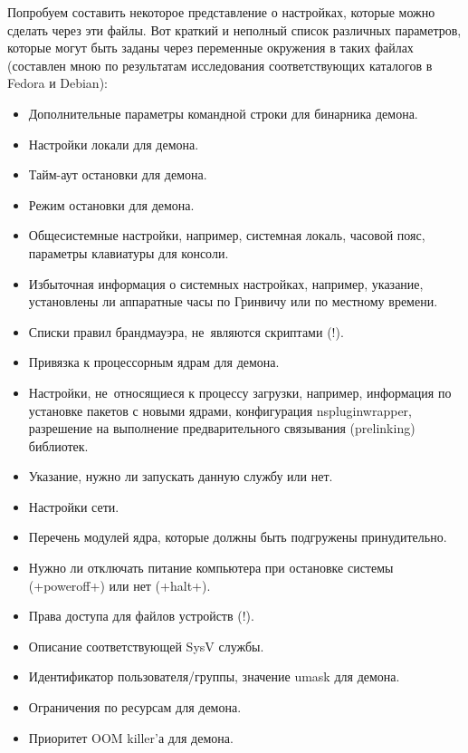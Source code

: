 \documentclass[10pt,oneside,a4paper]{article}
\begin{document}
Попробуем составить некоторое представление о настройках, которые можно сделать
через эти файлы. Вот краткий и неполный список различных параметров, которые
могут быть заданы через переменные окружения в таких файлах (составлен мною по
результатам исследования соответствующих каталогов в Fedora и Debian):
\begin{itemize}
	\item Дополнительные параметры командной строки для бинарника демона.
	\item Настройки локали для демона.
	\item Тайм-аут остановки для демона.
	\item Режим остановки для демона.
	\item Общесистемные настройки, например, системная локаль, часовой пояс,
		параметры клавиатуры для консоли.
	\item Избыточная информация о системных настройках, например, указание,
		установлены ли аппаратные часы по Гринвичу или по местному
		времени.
	\item Списки правил брандмауэра, не~являются скриптами (!).
	\item Привязка к процессорным ядрам для демона.
	\item Настройки, не~относящиеся к процессу загрузки, например,
		информация по установке пакетов с новыми ядрами, конфигурация
		nspluginwrapper, разрешение на выполнение
		предварительного связывания (prelinking) библиотек.
	\item Указание, нужно ли запускать данную службу или нет.
	\item Настройки сети.
	\item Перечень модулей ядра, которые должны быть подгружены
		принудительно.
	\item Нужно ли отключать питание компьютера при остановке системы
		(+poweroff+) или нет (+halt+).
	\item Права доступа для файлов устройств (!).
	\item Описание соответствующей SysV службы.
	\item Идентификатор пользователя/группы, значение umask для демона.
	\item Ограничения по ресурсам для демона.
	\item Приоритет OOM killer'а для демона.
\end{itemize}
\end{document}
